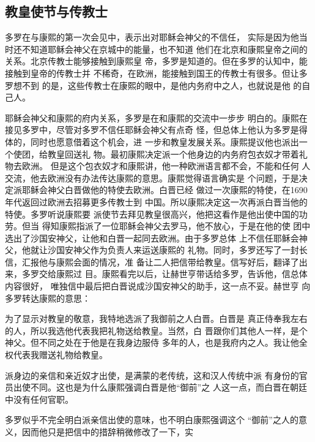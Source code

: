 \subsection{教皇使节与传教士}
\par
多罗在与康熙的第一次会见中，表示出对耶稣会神父的不信任，%
实际是因为他当时还不知道耶稣会神父在京城中的能量，也不知道%
他们在北京和康熙皇帝之间的关系。北京传教士能够接触到康熙皇%
帝，多罗是知道的。但在多罗的认知中，能接触到皇帝的传教士并%
不稀奇，在欧洲，能接触到国王的传教士有很多。但让多罗想不到%
的是，这些传教士在康熙的眼中，是他内务府中之人，也就说是他%
的自己人。%
\par
耶稣会神父和康熙的府内关系，多罗是在和康熙的交流中一步步%
明白的。康熙在接见多罗中，尽管对多罗不信任耶稣会神父有点奇%
怪，但总体上他认为多罗是得体的，同时也愿意借着这个机会，进%
一步和教皇发展关系。康熙提议他也派出一个使团，给教皇回送礼%
物。最初康熙决定派一个他身边的内务府包衣奴才带着礼物去欧洲。%
但是这个包衣奴才和康熙讲，他一种欧洲语言都不会，不能和任何%
人交流，他去欧洲没有办法传达康熙的意思。康熙觉得语言确实是%
个问题，于是决定派耶稣会神父白晋做他的特使去欧洲。白晋已经%
做过一次康熙的特使，在1690年代返回过欧洲去招募更多传教士到%
中国。所以康熙决定这一次再派白晋当他的特使。多罗听说康熙要%
派使节去拜见教皇很高兴，他把这看作是他出使中国的功劳。但当%
得知康熙指派了一位耶稣会神父去罗马，他不放心，于是在他的使%
团中选出了沙国安神父，让他和白晋一起同去欧洲。由于多罗总体%
上不信任耶稣会神父，他就让沙国安神父作为负责人来运送康熙的%
礼物。同时，多罗还写了一封长信，汇报他与康熙会面的情况，准%
备让二人把信带给教皇。信写好后，翻译了出来，多罗交给康熙过%
目。康熙看完以后，让赫世亨带话给多罗，告诉他，信总体内容很好，%
唯独信中最后把白晋说成沙国安神父的助手，这一点不妥。赫世亨%
向多罗转达康熙的意思：%
\par
{\bookkai 为了显示对教皇的敬意，我特地选派了我御前之人白晋。白晋是}%
{\bookkai 真正侍奉我左右的人，所以我选他代表我把礼物送给教皇。当然，白}%
{\bookkai 晋跟你们其他人一样，是个神父。但不同之处在于他是在我身边服侍}%
{\bookkai 多年的人，也是我府内之人。我让他全权代表我赠送礼物给教皇。}%
\par
派身边的亲信和亲近奴才出使，是满蒙的老传统，这和汉人传统中派%
有身份的官员出使不同。这也是为什么康熙强调白晋是他“御前”之%
人这一点，而白晋在朝廷中没有任何官职。%
\par
多罗似乎不完全明白派亲信出使的意味，也不明白康熙强调这个%
“御前”之人的意义，因而他只是把信中的措辞稍微修改了一下，实%
